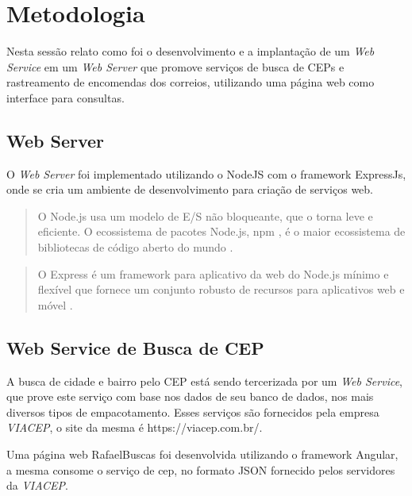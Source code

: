 \documentclass[12pt]{article}
\begin{document}
\section{Metodologia}
Nesta sessão relato como foi o desenvolvimento e a implantação de um \textit{Web Service} em um \textit{Web Server} que promove serviços de busca de CEPs e rastreamento de encomendas dos correios, utilizando uma página web como interface para consultas.
 
\subsection{Web Server}
	O \textit{Web Server} foi implementado utilizando o NodeJS com o framework ExpressJs, onde se cria um ambiente de desenvolvimento para criação de serviços web.
	\begin{quote}
	O Node.js usa um modelo de E/S não bloqueante, que o torna leve e eficiente. O ecossistema de pacotes Node.js, npm , é o maior ecossistema de bibliotecas de código aberto do mundo \cite{nodejs}.
	\end{quote}
	\begin{quote}
	O Express é um framework para aplicativo da web do Node.js mínimo e flexível que fornece um conjunto robusto de recursos para aplicativos web e móvel \cite{expressjs}.
	\end{quote}

\subsection{Web Service de Busca de CEP}
	A busca de cidade e bairro pelo CEP está sendo tercerizada por um \textit{Web Service}, que prove este serviço com base nos dados de seu banco de dados, nos mais diversos tipos de empacotamento. Esses serviços são fornecidos pela empresa \textit{VIACEP}, o site da mesma é https://viacep.com.br/.

	Uma página web RafaelBuscas foi desenvolvida utilizando o framework Angular, a mesma consome o serviço de cep, no formato JSON fornecido pelos servidores da \textit{VIACEP}.
	
\end{document}
